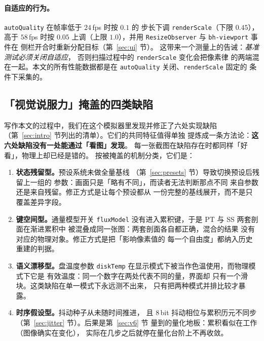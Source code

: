 \paragraph{自适应的行为。}
\texttt{autoQuality} 在帧率低于 $24$\,fps 时按 $0.1$ 的
步长下调 \texttt{renderScale}（下限 $0.45$），高于 $58$\,fps
时按 $0.05$ 上调（上限 $1.0$），并用
\texttt{ResizeObserver} 与 \texttt{bh-viewport} 事件在
侧栏开合时重新分配目标（第~\ref{sec:ui} 节）。
这带来一个测量上的告诫：\emph{基准测试必须关闭自适应}，
否则扫描过程中的 \texttt{renderScale} 变化会把像素律
的两端混在一起。本文的所有性能数据都是在
\texttt{autoQuality} 关闭、\texttt{renderScale} 固定的
条件下采集的。

\subsection{「视觉说服力」掩盖的四类缺陷}\label{sec:discuss-lessons}

写作本文的过程中，我们在这个模拟器里发现并修正了六处实现缺陷
（第~\ref{sec:intro} 节列出的清单）。它们的共同特征值得单独
提炼成一条方法论：\textbf{这六处缺陷没有一处能通过「看图」发现}。
每一张截图在缺陷存在时都同样「好看」，物理上却已经是错的。
按被掩盖的机制分类，它们是：

\begin{enumerate}[leftmargin=1.8em,itemsep=2pt,topsep=3pt]
  \item \textbf{状态残留型。}预设系统未做全量基线
        （第~\ref{sec:presets} 节）导致切换预设后残留上一组的
        参数：画面只是「略有不同」，而读者无法判断那点不同
        来自参数还是来自残留。修正方式是让每个预设都从
        一份完整的基线展开，而不是只覆盖差异字段。
  \item \textbf{键空间型。}通量模型开关 \texttt{fluxModel}
        没有进入累积键，于是 PT 与 SS 两套剖面在渐进累积中
        被混叠成同一张图：两套剖面各自都正确，混合的结果
        没有对应的物理对象。修正方式是把「影响像素值的
        每一个自由度」都纳入历史重建的判据。
  \item \textbf{语义漂移型。}盘温度参数 \texttt{diskTemp}
        在显示模式下被当作色温使用，而物理模式下它是
        有效温度：同一个数字在两处代表不同的量，界面却
        只有一个滑块。这类缺陷在单一模式下永远测不出来，
        只有把两种模式并排比较才暴露。
  \item \textbf{时序假设型。}抖动种子从未随时间推进，
        且 $8$\,bit 抖动相位与累积历元不同步
        （第~\ref{sec:jitter} 节）。后果是第~\ref{sec:v6} 节
        量到的量化地板：累积看似在工作（图像确实在变化），
        实际在几步之后就停在量化台阶上不再收敛。
\end{enumerate}

